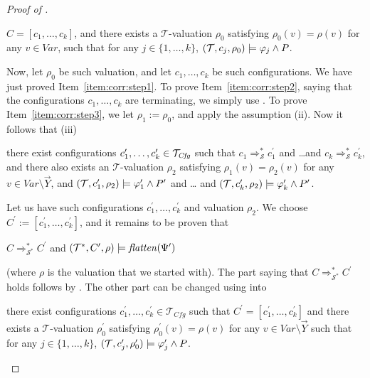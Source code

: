 \begin{proof}[Proof of ]
\begin{enumerate}
\begin{proofenv}
        $C = [c_1, \ldots, c_k ]$, and
        there exists a $\mathcal{T}$-valuation $\rho_0$ satisfying $\rho_0(v) = \rho(v)$
        for any $v \in \mathit{Var}$,
        such that for any $j \in \{ 1, \ldots, k \}$, $(\mathcal{T} , c_j , \rho_0 ) \models  \varphi_j \land P$.
    \end{proofenv}
    Now, let $\rho_0$ be such valuation,
    and let $c_1,\ldots,c_k$ be such configurations. We have just proved Item~\ref{item:corr:step1}.
    To prove Item~\ref{item:corr:step2}, saying that the configurations $c_1, \ldots, c_k$ are terminating,
    we simply use .
    To prove Item~\ref{item:corr:step3}, we let $\rho_1 := \rho_0$, and apply the assumption (ii).
    Now it follows that (iii)
    \begin{proofenv}
        there exist configurations $c_1^\prime,\ldots,c_k^\prime \in \mathcal{T}_{\mathit{Cfg}}$
        such that $c_1 \Rightarrow^{*}_{\mathcal{S}} c_1^\prime$
        and \ldots and $c_k \Rightarrow^{*}_{\mathcal{S}} c_k^\prime$,
        and there also exists an $\mathcal{T}$-valuation $\rho_2$
        satisfying $\rho_1(v) = \rho_2(v)$ for any $v \in \mathit{Var} \setminus \vec{Y}$,
        and
        $(\mathcal{T}, c_1^\prime,\rho_2) \models \varphi^\prime_1 \land P^\prime$ and \ldots
        and $(\mathcal{T}, c_k^\prime, \rho_2) \models \varphi^\prime_k \land P^\prime$.
    \end{proofenv}
    Let us have such configurations $c_1^\prime,\ldots,c_k^\prime$ and valuation $\rho_2$.
    We choose $C^\prime := [ c_1^\prime,\ldots,c_k^\prime ]$,
    and it remains to be proven that
    \begin{proofenv}
        $C \Rightarrow^*_{\mathcal{S}^*} C^\prime$ and $(\mathcal{T}^*, C^\prime, \rho) \models \mathit{flatten}(\Psi^\prime)$ \,
    \end{proofenv}
    (where $\rho$ is the valuation that we started with).
    The part saying that $C \Rightarrow^*_{\mathcal{S}^*} C^\prime$ holds
    follows by . The other part can be changed using  into
    \begin{proofenv}
        there exist configurations $c^\prime_1, \ldots, c^\prime_k \in \mathcal{T}_{\mathit{Cfg}}$ such that
        $C^\prime = [c^\prime_1, \ldots, c^\prime_k]$ and there exists a $\mathcal{T}$-valuation $\rho^\prime_0$
        satisfying $\rho^\prime_0(v) = \rho(v)$ for any $v \in \mathit{Var} \setminus \vec{Y}$
        such that for any $j \in \{ 1, \ldots, k \}$,
        $(\mathcal{T}, c^\prime_j, \rho^\prime_0) \models \varphi^\prime_j \land P$.

\end{proofenv}
\end{enumerate}
\end{proof}

